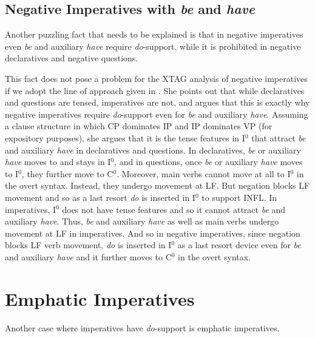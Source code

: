 \subsection{Negative Imperatives with {\it be} and {\it have}}

Another puzzling fact that needs to be explained  is that in negative
imperatives even {\it be} and auxiliary {\it have} require {\it
do}-support, while it is prohibited in negative declaratives and negative
questions.  



This fact does not pose a problem for the XTAG analysis of negative
imperatives if we adopt the line of approach given in \cite{handiss}.  She
points out that while declaratives and questions are tensed, imperatives
are not, and argues that this is exactly why negative imperatives require
{\it do}-support even for {\it be} and auxiliary {\it have}.  Assuming a
clause structure in which CP dominates IP and IP dominates VP (for
expository purposes), she argues that it is the tense features in I$^0$
that attract {\it be} and auxiliary {\it have} in declaratives and
questions.  In declaratives, {\it be} or auxiliary {\it have} moves to and
stays in I$^0$, and in questions, once {\it be} or auxiliary {\it have}
moves to I$^0$, they further move to C$^0$.  Moreover, main verbs cannot
move at all to I$^0$ in the overt syntax.  Instead, they undergo movement
at LF.  But negation blocks LF movement and so as a last resort {\it do} is
inserted in I$^0$ to support INFL.  In imperatives, I$^0$ does not have
tense features and so it cannot attract {\it be} and auxiliary {\it have}.
Thus, {\it be} and auxiliary {\it have} as well as main verbs undergo
movement at LF in imperatives.  And so in negative imperatives, since
negation blocks LF verb movement, {\it do} is inserted in I$^0$ as a last
resort device even for {\it be} and auxiliary {\it have} and it further
moves to C$^0$ in the overt syntax.

\section{Emphatic Imperatives}

Another case where imperatives have {\it do}-support is emphatic
imperatives.


